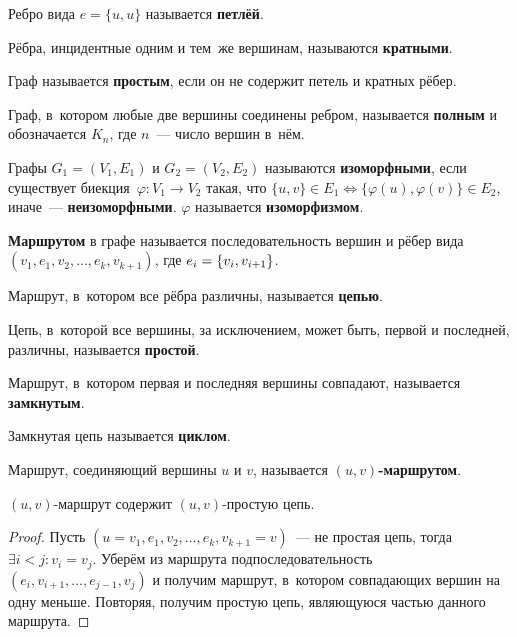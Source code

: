  Ребро вида $e = \{ u, u \}$ называется \textbf{петлёй}.

Рёбра, инцидентные одним и тем~же вершинам, называются \textbf{кратными}.

Граф называется \textbf{простым}, если он не содержит петель и кратных рёбер.

Граф, в~котором любые две вершины соединены ребром, называется \textbf{полным} и обозначается $K_n$, где $n$~--- число вершин в~нём.

Графы $G_1 = (V_1, E_1)$ и $G_2 = (V_2, E_2)$ называются \textbf{изоморфными}, если существует биекция~$\varphi \colon V_1 \to V_2$ такая, что
$\{ u, v \} \in E_1 \Leftrightarrow \{ \varphi(u), \varphi(v) \} \in E_2$, иначе~--- \textbf{неизоморфными}.
$\varphi$ называется \textbf{изоморфизмом}.

 \textbf{Маршрутом} в графе называется последовательность вершин и рёбер вида
$(v_1, e_1, v_2, \ldots, \allowbreak e_k, v_{k+1})$, где $e_i \opbr= \{ v_i, v_{i+1} \}$.

 Маршрут, в~котором все рёбра различны, называется \textbf{цепью}.

Цепь, в~которой все вершины, за исключением, может быть, первой и последней, различны, называется \textbf{простой}.

Маршрут, в~котором первая и последняя вершины совпадают, называется \textbf{замкнутым}.

 Замкнутая цепь называется \textbf{циклом}.

Маршрут, соединяющий вершины $u$ и $v$, называется \textbf{$(u, v)$-маршрутом}.

\begin{lemma}
\label{lemma:walk_contains_simple_chain}
$(u, v)$-маршрут содержит $(u, v)$-простую цепь.
\end{lemma}
\begin{proof}
Пусть $(u = v_1, e_1, v_2, \ldots, e_k, v_{k+1} = v)$~--- не простая цепь, тогда $\exists i < j \colon v_i = v_j$.
Уберём из маршрута подпоследовательность $(e_i, v_{i+1}, \ldots, e_{j-1}, v_j)$ и получим маршрут, в~котором совпадающих вершин на одну меньше.
Повторяя, получим простую цепь, являющуюся частью данного маршрута.
\end{proof}

